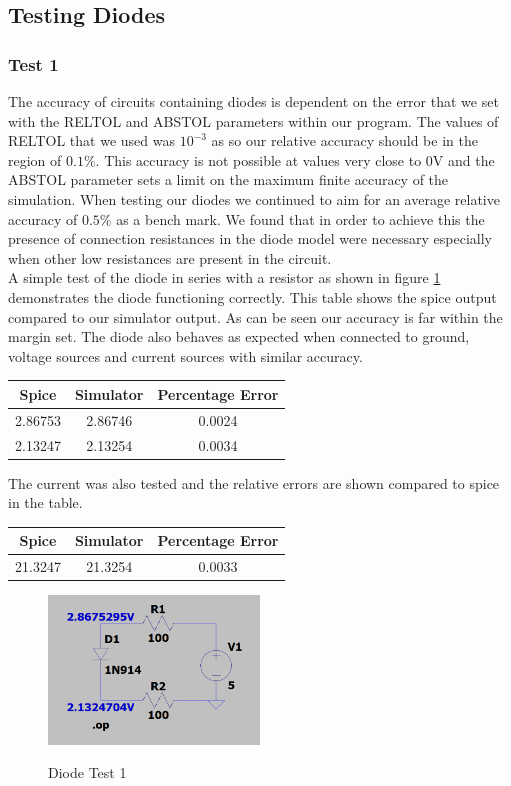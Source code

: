 \documentclass{article}
\begin{document}
\subsection{Testing Diodes}
\subsubsection{Test 1}
The accuracy of circuits containing diodes is dependent on the error that we set with the RELTOL and ABSTOL parameters within our program. The values of RELTOL that we used was $10^{-3}$ as so our relative accuracy should be in the region of $0.1\%$. This accuracy is not possible at values very close to 0V and the ABSTOL parameter sets a limit on the maximum finite accuracy of the simulation. When testing our diodes we continued to aim for an average relative accuracy of $0.5\%$ as a bench mark. We found that in order to achieve this the presence of connection resistances in the diode model were necessary especially when other low resistances are present in the circuit. \\
A simple test of the diode in series with a resistor as shown in figure \ref{fig:DiodeTest1} demonstrates the diode functioning correctly. This table shows the spice output compared to our simulator output. As can be seen our accuracy is far within the margin set. The diode also behaves as expected when connected to ground, voltage sources and current sources with similar accuracy.  
\begin{center}
\begin{tabular}{ ||c| c ||c ||}
\hline
 Spice & Simulator & Percentage Error \\ 
 \hline
 2.86753 & 2.86746 & 0.0024 \\  
 2.13247 & 2.13254 & 0.0034 \\   
 \hline
\end{tabular}
\end{center}
The current was also tested and the relative errors are shown compared to spice in the table.
\begin{center}
\begin{tabular}{ ||c| c ||c ||}
\hline
 Spice & Simulator & Percentage Error \\ 
 \hline
 21.3247 & 21.3254 & 0.0033 \\  
 \hline
\end{tabular}
\end{center}
\begin{figure}[h]
    \caption{Diode Test 1}
    \centering
    \includegraphics[width=0.5\textwidth]{images/DiodeTest1.png}
    \label{fig:DiodeTest1}
\end{figure}
\end{document}
